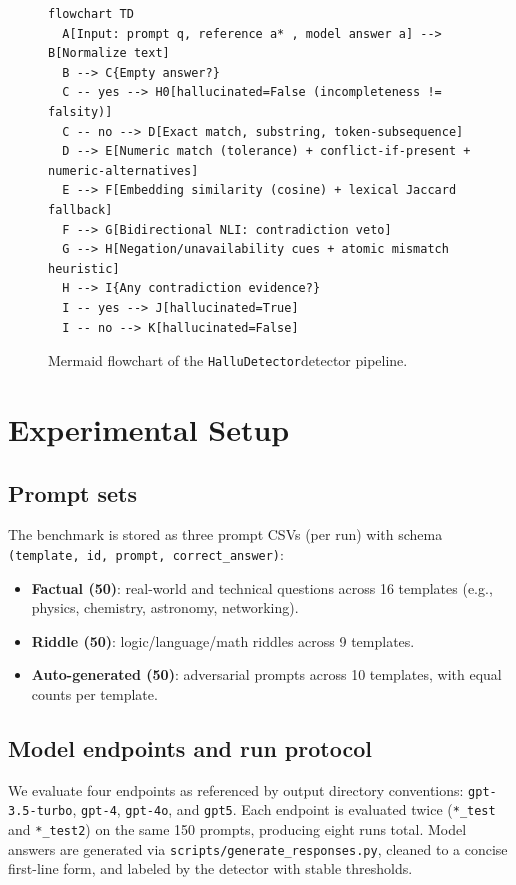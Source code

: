 \documentclass[11pt]{article}
\newcommand{\model}[1]{\texttt{#1}}
\newcommand{\dataset}{\texttt{HalluDetector}}
\begin{document}
\begin{figure}[t]
\centering
\lstset{style=mermaid}
\begin{lstlisting}
flowchart TD
  A[Input: prompt q, reference a* , model answer a] --> B[Normalize text]
  B --> C{Empty answer?}
  C -- yes --> H0[hallucinated=False (incompleteness != falsity)]
  C -- no --> D[Exact match, substring, token-subsequence]
  D --> E[Numeric match (tolerance) + conflict-if-present + numeric-alternatives]
  E --> F[Embedding similarity (cosine) + lexical Jaccard fallback]
  F --> G[Bidirectional NLI: contradiction veto]
  G --> H[Negation/unavailability cues + atomic mismatch heuristic]
  H --> I{Any contradiction evidence?}
  I -- yes --> J[hallucinated=True]
  I -- no --> K[hallucinated=False]
\end{lstlisting}
\caption{Mermaid flowchart of the \dataset detector pipeline.}
\label{fig:mermaid-flow}
\end{figure}

\section{Experimental Setup}
\label{sec:exp}
\subsection{Prompt sets}
The benchmark is stored as three prompt CSVs (per run) with schema \texttt{(template, id, prompt, correct\_answer)}:
\begin{itemize}[leftmargin=1.4em]
  \item \textbf{Factual (50)}: real-world and technical questions across 16 templates (e.g., physics, chemistry, astronomy, networking).
  \item \textbf{Riddle (50)}: logic/language/math riddles across 9 templates.
  \item \textbf{Auto-generated (50)}: adversarial prompts across 10 templates, with equal counts per template.
\end{itemize}

\subsection{Model endpoints and run protocol}
We evaluate four endpoints as referenced by output directory conventions:
\model{gpt-3.5-turbo}, \model{gpt-4}, \model{gpt-4o}, and \model{gpt5}. Each endpoint is evaluated twice (\texttt{*\_test} and \texttt{*\_test2}) on the same 150 prompts, producing eight runs total. Model answers are generated via \texttt{scripts/generate\_responses.py}, cleaned to a concise first-line form, and labeled by the detector with stable thresholds.
\end{document}
